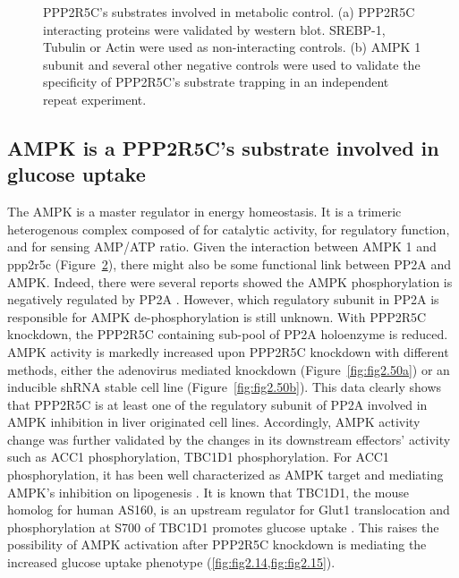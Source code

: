 \begin{figure}[!t]
\begin{subfigure}[t]{0.48\textwidth}
    \label{fig:fig2.47b}
	\end{subfigure}
\caption[Metabolic regulators as PPP2R5C's substrates]{\footnotesize PPP2R5C's substrates involved in metabolic control. (a) PPP2R5C interacting proteins were validated by western blot. SREBP-1, Tubulin or Actin were used as non-interacting controls. (b) AMPK \textbeta{}1 subunit and several other negative controls were used to validate the specificity of PPP2R5C's substrate trapping in an independent repeat experiment.}
\label{fig:fig2.47}
\end{figure}


\subsection{AMPK is a PPP2R5C's substrate involved in glucose uptake}

The \gls{AMPK} is a master regulator in energy homeostasis. It is a trimeric heterogenous complex composed of \textalpha{} for catalytic activity, \textbeta{} for regulatory function, and \textgamma{} for sensing AMP/\gls{ATP} ratio. Given the interaction between \gls{AMPK} \textbeta{}1 and \gls{ppp2r5c} (Figure~\ref{fig:fig2.47}), there might also be some functional link between \gls{PP2A} and \gls{AMPK}. Indeed, there were several reports showed the \gls{AMPK} phosphorylation is negatively regulated by \gls{PP2A} \cite{park_ampk_2013,wang_pp2a_2010,wu_activation_2007}. However, which regulatory subunit in \gls{PP2A} is responsible for \gls{AMPK} de-phosphorylation is still unknown. With PPP2R5C knockdown, the PPP2R5C containing sub-pool of \gls{PP2A} holoenzyme is reduced. \gls{AMPK} activity is markedly increased upon PPP2R5C knockdown with different methods, either the adenovirus mediated knockdown (Figure~\ref{fig:fig2.50a}) or an inducible shRNA stable cell line (Figure~\ref{fig:fig2.50b}). This data clearly shows that PPP2R5C is at least one of the regulatory subunit of \gls{PP2A} involved in \gls{AMPK} inhibition in liver originated cell lines. Accordingly, \gls{AMPK} activity change was further validated by the changes in its downstream effectors' activity such as ACC1 phosphorylation, TBC1D1 phosphorylation. For ACC1 phosphorylation, it has been well characterized as AMPK target and mediating AMPK's inhibition on lipogenesis \cite{ha_critical_1994,sullivan_inhibition_1994}. It is known that TBC1D1, the mouse homolog for human AS160, is an upstream regulator for Glut1 translocation and  phosphorylation at S700 of TBC1D1 promotes glucose uptake \cite{vichaiwong_contraction_2010,zhou_akt_2008}. This raises the possibility of AMPK activation after PPP2R5C knockdown is mediating the increased glucose uptake phenotype (\cref{fig:fig2.14,fig:fig2.15}).

